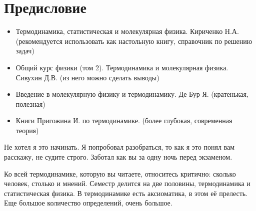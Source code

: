 \documentclass[../main.tex]{subfiles}
\begin{document}
\section*{Предисловие}
\begin{itemize}
    \item Термодинамика, статистическая и молекулярная физика. Кириченко Н.А. (рекомендуется использовать как настольную книгу, справочник по решению задач)
    \item Общий курс физики (том 2). Термодинамика и молекулярная физика. Сивухин Д.В. (из него можно сделать выводы)
    \item Введение в молекулярную физику и термодинамику. Де Бур Я. (кратенькая, полезная)
    \item Книги Пригожина И. по термодинамике. (более глубокая, современная теория)
\end{itemize}
Не хотел я это начинать. Я попробовал разобраться, то как я это понял вам расскажу, не судите строго. Заботал как вы за одну ночь перед экзаменом.

Ко всей термодинамике, которую вы читаете, относитесь критично: сколько человек, столько и мнений.
Семестр делится на две половины, термодинамика и статистическая физика. В термодинамике есть аксиоматика, в этом её прелесть. Еще большое количество определений, очень большое.
\end{document}
